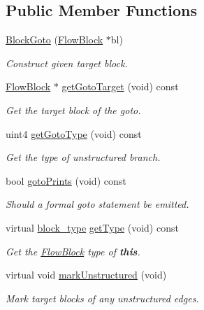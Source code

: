 \subsection*{Public Member Functions}
\begin{DoxyCompactItemize}
\item 
\mbox{\hyperlink{class_block_goto_a4dd56b2b7ce073b0ce3134db02708e80}{Block\+Goto}} (\mbox{\hyperlink{class_flow_block}{Flow\+Block}} $\ast$bl)
\begin{DoxyCompactList}\small\item\em Construct given target block. \end{DoxyCompactList}\item 
\mbox{\hyperlink{class_flow_block}{Flow\+Block}} $\ast$ \mbox{\hyperlink{class_block_goto_adc0965cdd2ec23445ad156cd2374d6ea}{get\+Goto\+Target}} (void) const
\begin{DoxyCompactList}\small\item\em Get the target block of the goto. \end{DoxyCompactList}\item 
uint4 \mbox{\hyperlink{class_block_goto_a89799c641a761f1cde85273610a20dfd}{get\+Goto\+Type}} (void) const
\begin{DoxyCompactList}\small\item\em Get the type of unstructured branch. \end{DoxyCompactList}\item 
bool \mbox{\hyperlink{class_block_goto_a2c4cc4dddc9aac456e0b439dc7a2ad1f}{goto\+Prints}} (void) const
\begin{DoxyCompactList}\small\item\em Should a formal goto statement be emitted. \end{DoxyCompactList}\item 
virtual \mbox{\hyperlink{class_flow_block_a70df78390870fcdd51e31426ba6a193e}{block\+\_\+type}} \mbox{\hyperlink{class_block_goto_a11f324c0fdd3849a53250a0d67b6c94e}{get\+Type}} (void) const
\begin{DoxyCompactList}\small\item\em Get the \mbox{\hyperlink{class_flow_block}{Flow\+Block}} type of {\bfseries{this}}. \end{DoxyCompactList}\item 
virtual void \mbox{\hyperlink{class_block_goto_acc562547e24a946794c7583e61208553}{mark\+Unstructured}} (void)
\begin{DoxyCompactList}\small\item\em Mark target blocks of any unstructured edges. \end{DoxyCompactList}\item 

\end{DoxyCompactItemize}
